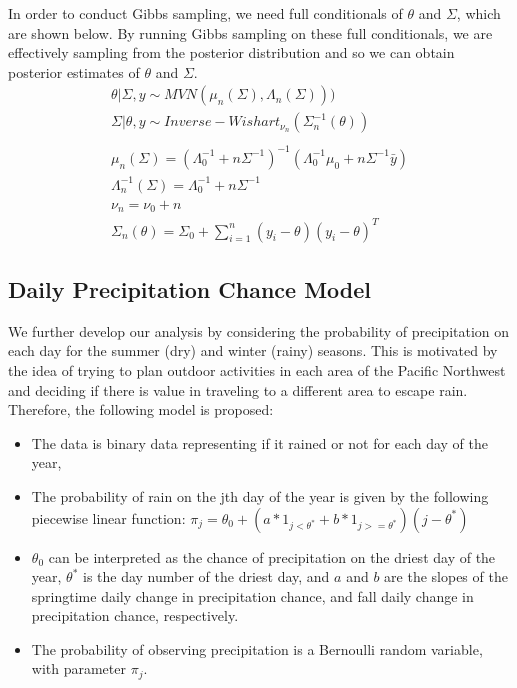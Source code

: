 \documentclass{article}
\begin{document}
In order to conduct Gibbs sampling, we need full conditionals of $\theta$ and $\Sigma$, which are shown below. By running Gibbs sampling on these full conditionals, we are effectively sampling from the posterior distribution and so we can obtain posterior estimates of $\theta$ and $\Sigma$.
\begin{align}
\theta | \Sigma, y \sim MVN(\mu_n(\Sigma), \Lambda_n(\Sigma)))  \nonumber \\
\Sigma | \theta, y \sim Inverse - Wishart_{\nu_n} (\Sigma_n^{-1}(\theta)) \nonumber \\
\nonumber \\
\mu_n(\Sigma) =(\Lambda_0^{-1} + n\Sigma^{-1})^{-1}(\Lambda_0^{-1}\mu_0 + n\Sigma^{-1}\bar{y}) \nonumber \\
\Lambda_n^{-1}(\Sigma) = \Lambda_0^{-1} + n\Sigma^{-1} \nonumber \\
\nu_n = \nu_0 + n \nonumber \\
\Sigma_n(\theta) = \Sigma_0 + \sum_{i=1}^n(y_i - \theta)(y_i - \theta)^T \nonumber
\end{align}

\subsection{Daily Precipitation Chance Model}

We further develop our analysis by considering the probability of precipitation on each day for the summer (dry) and winter (rainy) seasons. This is motivated by the idea of trying to plan outdoor activities in each area of the Pacific Northwest and deciding if there is value in traveling to a different area to escape rain.
Therefore, the following model is proposed:
\begin{itemize}
\item The data is binary data representing if it rained or not for each day of the year,
\item The probability of rain on the jth day of the year is given by the following piecewise linear function: $\pi_j = \theta_0 + (a * 1_{j < \theta^*} + b*1_{j>=\theta^*})(j - \theta^*)$
\item $\theta_0$ can be interpreted as the chance of precipitation on the driest day of the year, $\theta^*$ is the day number of the driest day, and $a$ and $b$ are the slopes of the springtime daily change in precipitation chance, and fall daily change in precipitation chance, respectively.
\item The probability of observing precipitation is a Bernoulli random variable, with parameter $\pi_j$.
\end{itemize}
\end{document}
